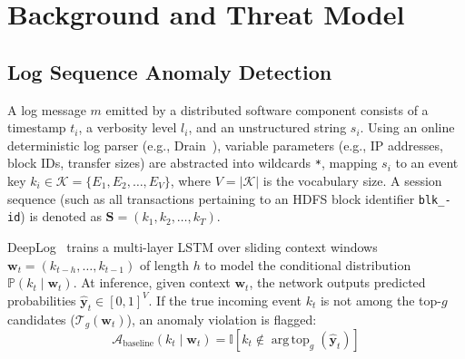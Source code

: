 \documentclass[letterpaper,twocolumn,10pt]{article}
\begin{document}
\section{Background and Threat Model}
\label{sec:threat_model}

\subsection{Log Sequence Anomaly Detection}
A log message $m$ emitted by a distributed software component consists of a timestamp $t_i$, a verbosity level $l_i$, and an unstructured string $s_i$. Using an online deterministic log parser (e.g., Drain~\cite{he2017drain}), variable parameters (e.g., IP addresses, block IDs, transfer sizes) are abstracted into wildcards \texttt{*}, mapping $s_i$ to an event key $k_i \in \mathcal{K} = \{E_1, E_2, \dots, E_V\}$, where $V = |\mathcal{K}|$ is the vocabulary size. A session sequence (such as all transactions pertaining to an HDFS block identifier \texttt{blk\_-id}) is denoted as $\mathbf{S} = (k_1, k_2, \dots, k_T)$.

DeepLog~\cite{du2017deeplog} trains a multi-layer LSTM over sliding context windows $\mathbf{w}_t = (k_{t-h}, \dots, k_{t-1})$ of length $h$ to model the conditional distribution $\mathbb{P}(k_t \mid \mathbf{w}_t)$. At inference, given context $\mathbf{w}_t$, the network outputs predicted probabilities $\hat{\mathbf{y}}_t \in [0, 1]^V$. If the true incoming event $k_t$ is not among the top-$g$ candidates ($\mathcal{T}_g(\mathbf{w}_t)$), an anomaly violation is flagged:
\begin{equation}
\label{eq:deeplog_baseline}
\mathcal{A}_{\text{baseline}}(k_t \mid \mathbf{w}_t) = \mathbb{I}\left[ k_t \notin \operatorname{arg\,top}_g(\hat{\mathbf{y}}_t) \right]
\end{equation}
\end{document}
